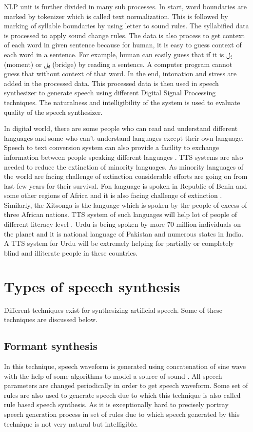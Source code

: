 NLP unit is further divided in many sub processes. In start, word boundaries are marked by tokenizer which is called text normalization. This is followed by marking of syllable boundaries by using letter to sound rules. The syllabified data is processed to apply sound change rules. The data is also process to get context of each word in given sentence because for human, it is easy to guess context of each word in a sentence. For example, human can easily guess that if it is \texturdu{پل} (moment) or \texturdu{پل} (bridge) by reading a sentence. A computer program cannot guess that without context of that word. In the end, intonation and stress are added in the processed data. This processed data is then used in speech synthesizer to generate speech using different Digital Signal Processing techniques. The naturalness and intelligibility of the system is used to evaluate quality of the speech synthesizer.

In digital world, there are some people who can read and understand different languages and some who can’t understand languages except their own language. Speech to text conversion system can also provide a facility to exchange information between people speaking different languages \cite{khilari2015review}. TTS systems are also needed to reduce the extinction of minority languages. As minority languages of the world are facing challenge of extinction considerable efforts are going on from last few years for their survival. Fon language is spoken in Republic of Benin and some other regions of Africa and it is also facing challenge of extinction \cite{dagba2014text}. Similarly, the Xitsonga is the language which is spoken by the people of excess of three African nations. TTS system of such languages will help lot of people of different literacy level \cite{baloyi2012text}. Urdu is being spoken by more 70 million individuals on the planet \cite{top_30_languages} and it is national language of Pakistan and numerous states in India. A TTS system for Urdu will be extremely helping for partially or completely blind and illiterate people in these countries.

\section{Types of speech synthesis}
Different techniques exist for synthesizing artificial speech. Some of these techniques are discussed below.

\subsection{Formant synthesis}
In this technique, speech waveform is generated using concatenation of sine wave with the help of some algorithms to model a source of sound \cite{format_synthesis}. All speech parameters are changed periodically in order to get speech waveform. Some set of rules are also used to generate speech due to which this technique is also called rule based speech synthesis. As it is exceptionally hard to precisely portray speech generation process in set of rules due to which speech generated by this technique is not very natural but intelligible.

